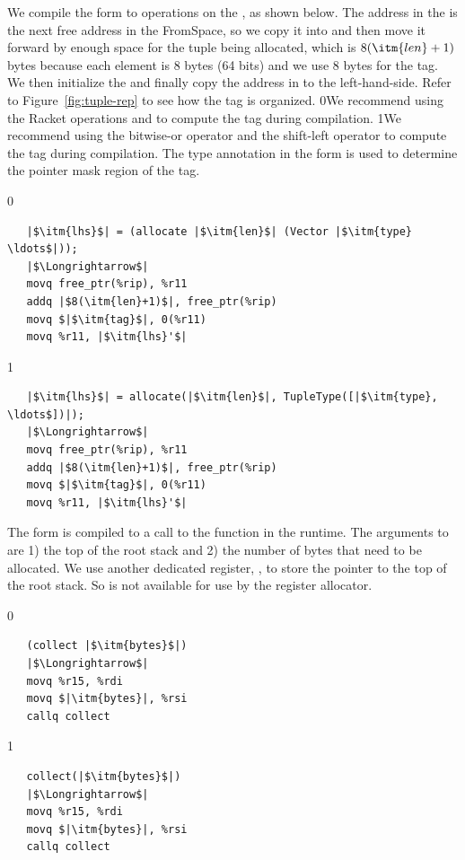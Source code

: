 \documentclass[7x10]{TimesAPriori_MIT}%
\def\racketEd{0}
\def\pythonEd{1}
\def\edition{1}
\newcommand{\racket}[1]{{\if\edition\racketEd{#1}\fi}}
\newcommand{\python}[1]{{\if\edition\pythonEd #1\fi}}
\begin{document}
We compile the  form to operations on the
, as shown below. The address in the 
is the next free address in the FromSpace, so we copy it into
 and then move it forward by enough space for the tuple
being allocated, which is $8(\itm{len}+1)$ bytes because each element
is 8 bytes (64 bits) and we use 8 bytes for the tag.  We then
initialize the  and finally copy the address in  to
the left-hand-side. Refer to Figure~\ref{fig:tuple-rep} to see how the
tag is organized.
%
\racket{We recommend using the Racket operations
\code{bitwise-ior} and \code{arithmetic-shift} to compute the tag
during compilation.}
%
\python{We recommend using the bitwise-or operator \code{|} and the
  shift-left operator \code{<<} to compute the tag during
  compilation.}
%
The type annotation in the  form is used to determine
the pointer mask region of the tag.
%
{\if\edition\racketEd
\begin{lstlisting}
   |$\itm{lhs}$| = (allocate |$\itm{len}$| (Vector |$\itm{type} \ldots$|));
   |$\Longrightarrow$|
   movq free_ptr(%rip), %r11
   addq |$8(\itm{len}+1)$|, free_ptr(%rip)
   movq $|$\itm{tag}$|, 0(%r11)
   movq %r11, |$\itm{lhs}'$|
\end{lstlisting}
\fi}
{\if\edition\pythonEd    
\begin{lstlisting}
   |$\itm{lhs}$| = allocate(|$\itm{len}$|, TupleType([|$\itm{type}, \ldots$])|);
   |$\Longrightarrow$|
   movq free_ptr(%rip), %r11
   addq |$8(\itm{len}+1)$|, free_ptr(%rip)
   movq $|$\itm{tag}$|, 0(%r11)
   movq %r11, |$\itm{lhs}'$|
\end{lstlisting}
\fi}
The  form is compiled to a call to the 
function in the runtime. The arguments to  are 1) the
top of the root stack and 2) the number of bytes that need to be
allocated.  We use another dedicated register, , to
store the pointer to the top of the root stack. So  is not
available for use by the register allocator.
{\if\edition\racketEd
\begin{lstlisting}
   (collect |$\itm{bytes}$|)
   |$\Longrightarrow$|
   movq %r15, %rdi
   movq $|\itm{bytes}|, %rsi
   callq collect
\end{lstlisting}
\fi}
{\if\edition\pythonEd    
\begin{lstlisting}
   collect(|$\itm{bytes}$|)
   |$\Longrightarrow$|
   movq %r15, %rdi
   movq $|\itm{bytes}|, %rsi
   callq collect
\end{lstlisting}
\fi}
\end{document}
